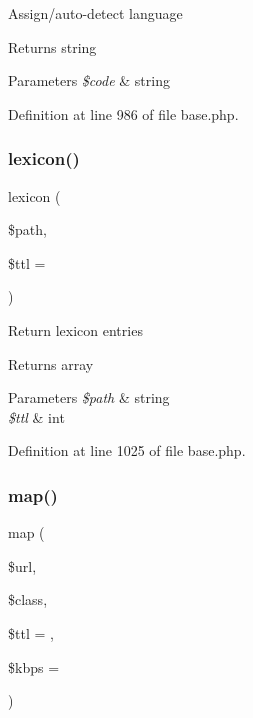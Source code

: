 Assign/auto-\/detect language \begin{DoxyReturn}{Returns}
string 
\end{DoxyReturn}

\begin{DoxyParams}{Parameters}
{\em \$code} & string \\
\hline
\end{DoxyParams}


Definition at line 986 of file base.\+php.

\hypertarget{class_base_a084dcc9ed975d967d44aeafc628db4da}{}\label{class_base_a084dcc9ed975d967d44aeafc628db4da} 
\subsubsection{\texorpdfstring{lexicon()}{lexicon()}}
{\footnotesize\ttfamily lexicon (\begin{DoxyParamCaption}\item[{}]{\$path,  }\item[{}]{\$ttl = {} }\end{DoxyParamCaption})}

Return lexicon entries \begin{DoxyReturn}{Returns}
array 
\end{DoxyReturn}

\begin{DoxyParams}{Parameters}
{\em \$path} & string \\
\hline
{\em \$ttl} & int \\
\hline
\end{DoxyParams}


Definition at line 1025 of file base.\+php.

\hypertarget{class_base_ad64de620e7d21824d5f36dad0fb75945}{}\label{class_base_ad64de620e7d21824d5f36dad0fb75945} 
\subsubsection{\texorpdfstring{map()}{map()}}
{\footnotesize\ttfamily map (\begin{DoxyParamCaption}\item[{}]{\$url,  }\item[{}]{\$class,  }\item[{}]{\$ttl = {},  }\item[{}]{\$kbps = {} }\end{DoxyParamCaption})}

